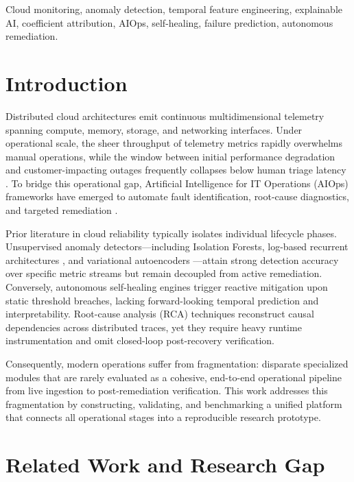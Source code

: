\documentclass[conference]{IEEEtran}
\begin{document}
\begin{IEEEkeywords}
Cloud monitoring, anomaly detection, temporal feature engineering, explainable AI, coefficient attribution, AIOps, self-healing, failure prediction, autonomous remediation.
\end{IEEEkeywords}

\section{Introduction}

Distributed cloud architectures emit continuous multidimensional telemetry spanning compute, memory, storage, and networking interfaces. Under operational scale, the sheer throughput of telemetry metrics rapidly overwhelms manual operations, while the window between initial performance degradation and customer-impacting outages frequently collapses below human triage latency \cite{Lin2019AIOps}. To bridge this operational gap, Artificial Intelligence for IT Operations (AIOps) frameworks have emerged to automate fault identification, root-cause diagnostics, and targeted remediation \cite{Bogatinovski2022AIOps,Notaro2021AIOps}.

Prior literature in cloud reliability typically isolates individual lifecycle phases. Unsupervised anomaly detectors---including Isolation Forests, log-based recurrent architectures \cite{Du2017DeepLog,Meng2019LogAnomaly}, and variational autoencoders \cite{Su2019OmniAnomaly,Xu2018Donut}---attain strong detection accuracy over specific metric streams but remain decoupled from active remediation. Conversely, autonomous self-healing engines \cite{Samir2019SelfHealing,Jiang2020Mitigation} trigger reactive mitigation upon static threshold breaches, lacking forward-looking temporal prediction and interpretability. Root-cause analysis (RCA) techniques \cite{Wang2018CloudRanger,Weng2018RCA,Chen2014CauseInfer} reconstruct causal dependencies across distributed traces, yet they require heavy runtime instrumentation and omit closed-loop post-recovery verification.

Consequently, modern operations suffer from fragmentation: disparate specialized modules that are rarely evaluated as a cohesive, end-to-end operational pipeline from live ingestion to post-remediation verification. This work addresses this fragmentation by constructing, validating, and benchmarking a unified platform that connects all operational stages into a reproducible research prototype.

\section{Related Work and Research Gap}
\end{document}
